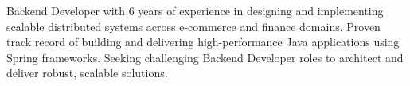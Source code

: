 Backend Developer with 6 years of experience in designing and implementing scalable distributed systems across e-commerce and finance domains. Proven track record of building and delivering high-performance Java applications using Spring frameworks. Seeking challenging Backend Developer roles to architect and deliver robust, scalable solutions.

